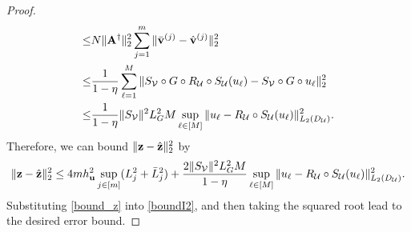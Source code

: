 \documentclass[11pt,twoside]{article}
\theoremstyle{plain}
\theoremstyle{definition}
\theoremstyle{remark}
\newcommand{\Ab}{\mathbf{A}}
\newcommand{\zb}{\mathbf{z}}
\newcommand{\ub}{\mathbf{u}}
\newcommand{\vb}{\mathbf{v}}
\newcommand{\Uc}{\mathcal{U}}
\newcommand{\Vc}{\mathcal{V}}
\begin{document}
\begin{proof}
\begin{equation*}
\begin{aligned}
\leq & N\|\Ab^\dagger\|_2^2 \sum_{j=1}^m \| \Bar{\vb}^{(j)} - \Hat{\vb}^{(j)}\|^2_2 \\
\leq & \frac{1}{1-\eta} \sum_{\ell=1}^M \|S_\Vc\circ G \circ R_\Uc \circ S_\Uc(u_\ell) -   S_\Vc\circ G \circ u_\ell\|^2_2 \\
\leq & \frac{1}{1-\eta} \|S_\Vc\|^2 L_G^2 M \sup_{\ell\in[M]}\| u_\ell - R_\Uc\circ S_\Uc(u_\ell)\|^2_{L_2(D_\Uc)}.
\end{aligned}
\end{equation*}
Therefore, we can bound $\|\zb-\Hat{\zb}\|_2^2$ by
\begin{equation}
\label{bound_z}
\| \zb - \Hat{\zb} \|_2^2 \leq 4mh_\ub^2\sup_{j\in[m]}(L_j^2+\Bar{L}_j^2) + \frac{2\|S_\Vc\|^2 L^2_G M}{1-\eta} \sup_{\ell\in[M]}\| u_\ell - R_\Uc\circ S_\Uc(u_\ell)\|^2_{L_2(D_\Uc)}.
\end{equation}
Substituting \eqref{bound_z} into \eqref{boundI2}, and then taking the squared root lead to the desired error bound.
\end{proof}
\end{document}
